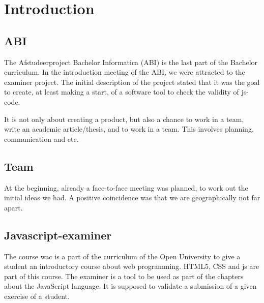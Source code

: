 \chapter{Introduction}


\section{ABI} 

The Afstudeerproject Bachelor Informatica (ABI) is the last part of the Bachelor curriculum.
In the introduction meeting of the ABI, we were attracted to the \gls{examiner} project.
The initial description of the project stated that it was the goal to create,
at least making a start, of a software tool to check the validity
of \gls{js-code}.

It is not only about creating a product, but also a chance to work in a team, write an academic article/thesis, and to work in a team.
This involves planning, communication and etc.


\section{Team}
At the beginning, already a face-to-face meeting was planned, to work out the initial ideas we had.
A positive coincidence was that we are geographically not far apart.


\section{Javascript-examiner}
The course \gls{wac} is a part of the curriculum of the Open University to give
a student an introductory course about web programming.
HTML5, CSS and \gls{js} are part of this course.
The \gls{examiner} is a tool to be used as part of the chapters about the JavaScript language.
It is supposed to validate a submission of a given exercise of a student.

